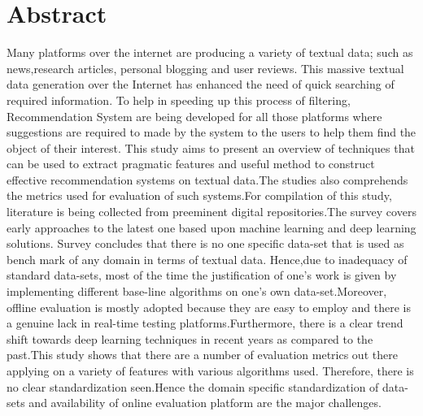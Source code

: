 \section{Abstract}
Many platforms over the internet are producing a variety of textual data; such as news,research articles, personal blogging and user reviews. This massive textual data generation over the Internet has enhanced the need of quick searching of required information. To help in speeding up this process of filtering, Recommendation System are being developed for all those platforms where suggestions are required to made by the system to the users to help them find the object of their interest. This study aims to present an overview of techniques that can be used to extract pragmatic features and useful method to construct effective recommendation systems on textual data.The studies also comprehends the metrics used for evaluation of such systems.For compilation of this study, literature is being collected from preeminent digital repositories.The survey covers early approaches to the latest one based upon machine learning and deep learning solutions. Survey concludes that there is no one specific data-set that is used as bench mark of any domain in terms of textual data. Hence,due to inadequacy of standard data-sets, most of the time the justification of one's work is given by implementing different base-line algorithms on one's own data-set.Moreover, offline evaluation is mostly adopted because they are easy to employ and there is a genuine lack in real-time testing platforms.Furthermore, there is a clear trend shift towards deep learning techniques in recent years as compared to the past.This study shows that there are a number of evaluation metrics out there applying on a variety of features with various algorithms used. Therefore, there is no clear standardization seen.Hence the domain specific standardization of data-sets and availability of online evaluation platform are the major challenges.     
